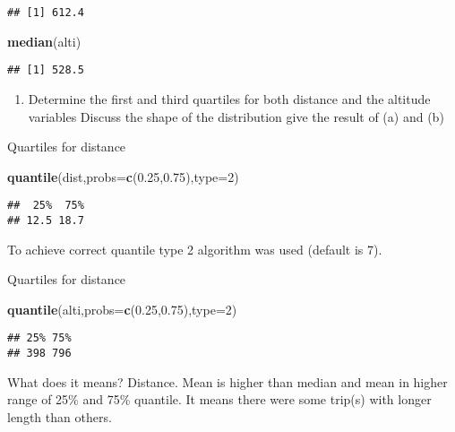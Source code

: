 \documentclass[
]{article}
\newenvironment{Shaded}{\begin{snugshade}}{\end{snugshade}}
\newcommand{\DataTypeTok}[1]{\textcolor[rgb]{0.13,0.29,0.53}{#1}}
\newcommand{\DecValTok}[1]{\textcolor[rgb]{0.00,0.00,0.81}{#1}}
\newcommand{\FloatTok}[1]{\textcolor[rgb]{0.00,0.00,0.81}{#1}}
\newcommand{\KeywordTok}[1]{\textcolor[rgb]{0.13,0.29,0.53}{\textbf{#1}}}
\newcommand{\NormalTok}[1]{#1}
\providecommand{\tightlist}{%
  \setlength{\itemsep}{0pt}\setlength{\parskip}{0pt}}
\begin{document}
\begin{verbatim}
## [1] 612.4
\end{verbatim}

\begin{Shaded}
\begin{Highlighting}[]
\KeywordTok{median}\NormalTok{(alti)}
\end{Highlighting}
\end{Shaded}

\begin{verbatim}
## [1] 528.5
\end{verbatim}

\begin{enumerate}
\def\labelenumi{\alph{enumi})}
\setcounter{enumi}{1}
\tightlist
\item
  Determine the first and third quartiles for both distance and the
  altitude variables Discuss the shape of the distribution give the
  result of (a) and (b)
\end{enumerate}

Quartiles for distance

\begin{Shaded}
\begin{Highlighting}[]
\KeywordTok{quantile}\NormalTok{(dist,}\DataTypeTok{probs=}\KeywordTok{c}\NormalTok{(}\FloatTok{0.25}\NormalTok{,}\FloatTok{0.75}\NormalTok{),}\DataTypeTok{type=}\DecValTok{2}\NormalTok{)}
\end{Highlighting}
\end{Shaded}

\begin{verbatim}
##  25%  75% 
## 12.5 18.7
\end{verbatim}

To achieve correct quantile type 2 algorithm was used (default is 7).

Quartiles for distance

\begin{Shaded}
\begin{Highlighting}[]
\KeywordTok{quantile}\NormalTok{(alti,}\DataTypeTok{probs=}\KeywordTok{c}\NormalTok{(}\FloatTok{0.25}\NormalTok{,}\FloatTok{0.75}\NormalTok{),}\DataTypeTok{type=}\DecValTok{2}\NormalTok{)}
\end{Highlighting}
\end{Shaded}

\begin{verbatim}
## 25% 75% 
## 398 796
\end{verbatim}

What does it means? Distance. Mean is higher than median and mean in
higher range of 25\% and 75\% quantile. It means there were some trip(s)
with longer length than others.
\end{document}
